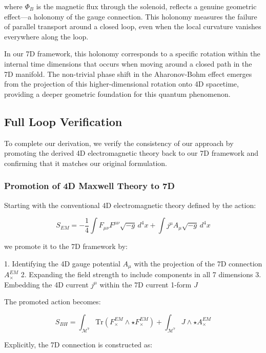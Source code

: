 \documentclass{article}
\begin{document}
where $\Phi_B$ is the magnetic flux through the solenoid, reflects a genuine geometric effect—a holonomy of the gauge connection. This holonomy measures the failure of parallel transport around a closed loop, even when the local curvature vanishes everywhere along the loop.

In our 7D framework, this holonomy corresponds to a specific rotation within the internal time dimensions that occurs when moving around a closed path in the 7D manifold. The non-trivial phase shift in the Aharonov-Bohm effect emerges from the projection of this higher-dimensional rotation onto 4D spacetime, providing a deeper geometric foundation for this quantum phenomenon.

\subsection{Full Loop Verification}

To complete our derivation, we verify the consistency of our approach by promoting the derived 4D electromagnetic theory back to our 7D framework and confirming that it matches our original formulation.

\subsubsection{Promotion of 4D Maxwell Theory to 7D}

Starting with the conventional 4D electromagnetic theory defined by the action:

\begin{equation}
S_{EM} = -\frac{1}{4}\int F_{\mu\nu}F^{\mu\nu} \sqrt{-g} \, d^4x + \int j^\mu A_\mu \sqrt{-g} \, d^4x
\end{equation}

we promote it to the 7D framework by:

1. Identifying the 4D gauge potential $A_{\mu}$ with the projection of the 7D connection $A^{EM}_{\times}$
2. Expanding the field strength to include components in all 7 dimensions
3. Embedding the 4D current $j^{\mu}$ within the 7D current 1-form $J$

The promoted action becomes:

\begin{equation}
S_{BH} = \int_{\mathcal{M}^7} \text{Tr}(F^{EM}_{\times} \wedge \star F^{EM}_{\times}) + \int_{\mathcal{M}^7} J \wedge \star A^{EM}_{\times}
\end{equation}

Explicitly, the 7D connection is constructed as:
\end{document}
